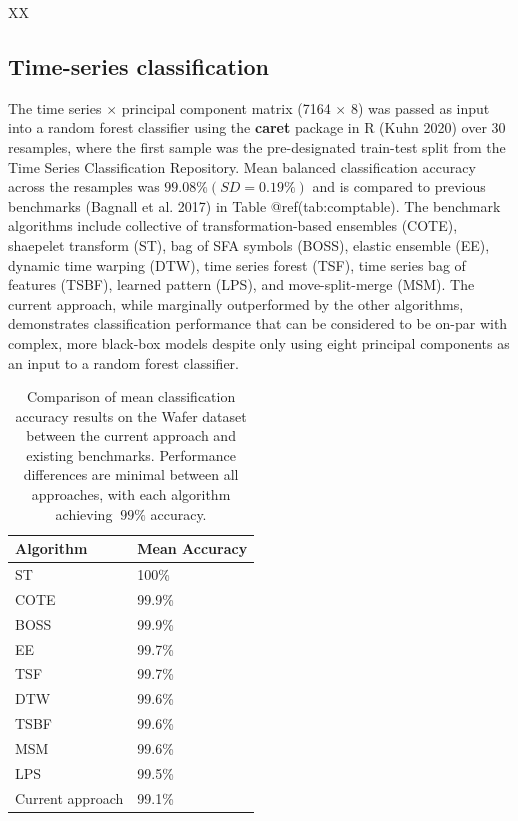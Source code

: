 \documentclass{article}
\begin{document}
XX

\hypertarget{time-series-classification}{%
\subsection{Time-series
classification}\label{time-series-classification}}

The time series \(\times\) principal component matrix (7164 \(\times\)
8) was passed as input into a random forest classifier using the
\textbf{caret} package in R (Kuhn 2020) over 30 resamples, where the
first sample was the pre-designated train-test split from the Time
Series Classification Repository. Mean balanced classification accuracy
across the resamples was \(99.08\% (SD=0.19\%)\) and is compared to
previous benchmarks (Bagnall et al. 2017) in Table @ref(tab:comptable).
The benchmark algorithms include collective of transformation-based
ensembles (COTE), shaepelet transform (ST), bag of SFA symbols (BOSS),
elastic ensemble (EE), dynamic time warping (DTW), time series forest
(TSF), time series bag of features (TSBF), learned pattern (LPS), and
move-split-merge (MSM). The current approach, while marginally
outperformed by the other algorithms, demonstrates classification
performance that can be considered to be on-par with complex, more
black-box models despite only using eight principal components as an
input to a random forest classifier.

\begin{table}

\caption{\label{tab:comptable}Comparison of mean classification accuracy results on the Wafer dataset between the current approach and existing benchmarks. Performance differences are minimal between all approaches, with each algorithm achieving $\>99\%$ accuracy.}
\centering
\begin{tabular}[t]{l|l}
\hline
Algorithm & Mean Accuracy\\
\hline
ST & 100\%\\
\hline
COTE & 99.9\%\\
\hline
BOSS & 99.9\%\\
\hline
EE & 99.7\%\\
\hline
TSF & 99.7\%\\
\hline
DTW & 99.6\%\\
\hline
TSBF & 99.6\%\\
\hline
MSM & 99.6\%\\
\hline
LPS & 99.5\%\\
\hline
Current approach & 99.1\%\\
\hline
\end{tabular}
\end{table}
\end{document}

